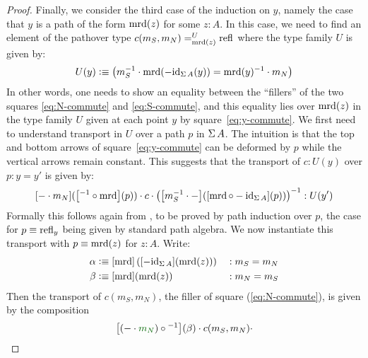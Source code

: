 \documentclass[english,a4paper]{lmcs}
\begin{document}
\begin{proof}
	Finally, we consider the third case of the induction on $y$, namely the case that $y$ is a path of the form $\operatorname{\mathrm{mrd}}(z)$ for some $z : A$.
        In this case, we need to find an element of the pathover type $c(m_S,m_N) =^{U}_{\operatorname{\mathrm{mrd}}(z)} \mathop{{\mathrm{refl}}_{}}$ where the type family $U$ is given by:
        \begin{displaymath}
          U(y) \vcentcolon\equiv \left( m_S^{-1} \cdot \operatorname{\mathrm{mrd}}(-\mathord{\mathrm{id}}_{\operatorname{\Sigma} A}(y)) = \operatorname{\mathrm{mrd}}(y)^{-1} \cdot m_N\right)
        \end{displaymath}
        In other words, one needs to show an equality between the ``fillers'' of the two squares \eqref{eq:N-commute} and \eqref{eq:S-commute}, and this equality lies over $\operatorname{\mathrm{mrd}}(z)$ in the type family $U$ given at each point $y$ by square~\eqref{eq:y-commute}.
        We first need to understand transport in $U$ over a path $p$ in $\operatorname{\Sigma} A$. %
        The intuition is that the top and bottom arrows of square~\eqref{eq:y-commute}
        can be deformed by $p$ while the vertical arrows remain constant.
        This suggests that the transport of $c:U(y)$ over $p:y=y'$ is given by:
        \begin{displaymath}
          \mathop{\left[{\mathord{{-}} \cdot m_N}\right]} (\mathop{\left[{^{-1} \circ \operatorname{\mathrm{mrd}}}\right]} (p))
          \cdot c \cdot
          \left( \mathop{\left[{m_S^{-1} \cdot \mathord{{-}}}\right]} (\mathop{\left[{\operatorname{\mathrm{mrd}} \circ -\mathord{\mathrm{id}}_{\operatorname{\Sigma} A}}\right]} (p)) \right)^{-1}
          : U(y')
        \end{displaymath}
        Formally this follows again from \cite[Lem~2.11.3]{HoTT},
        to be proved by path induction over $p$, the case for $p\equiv \mathop{{\mathrm{refl}}_{y}}$ being
        given by standard path algebra.
        We now instantiate this transport with $p \equiv \operatorname{\mathrm{mrd}}(z)$ for $z:A$. Write:
        \begin{alignat}{2}
	\alpha &\vcentcolon\equiv \mathop{\left[{\operatorname{\mathrm{mrd}}}\right]}\left(\mathop{\left[{-\mathord{\mathrm{id}}_{\operatorname{\Sigma} A}}\right]}(\operatorname{\mathrm{mrd}}(z))\right) && : m_S=m_N
        \label{eq:alpha-def}
        \\
        \beta &\vcentcolon\equiv \mathop{\left[{\operatorname{\mathrm{mrd}}}\right]}(\operatorname{\mathrm{mrd}}(z)) && : m_N=m_S
        \label{eq:beta-def}
	\end{alignat}
	Then the transport of $c(m_S,m_N)$, the filler of square (\ref{eq:N-commute}),
        is given by the composition
	\begin{equation}\label{eq:first-square-composed}
          \ap{(\blank\cdot {\color{darkgreen}m_N})\circ{}^{-1}}(\beta) \cdot c(m_S,m_N) \cdot

\end{equation}
\end{proof}
\end{document}

